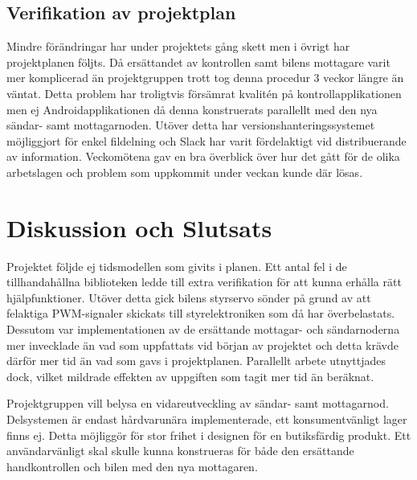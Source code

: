 \documentclass[a4paper]{article}
\begin{document}
\subsection{Verifikation av projektplan}
Mindre förändringar har under projektets gång skett men i övrigt har projektplanen följts. Då ersättandet av kontrollen samt bilens  mottagare varit mer komplicerad än projektgruppen trott tog denna procedur 3 veckor längre än väntat. Detta problem har troligtvis försämrat kvalitén på kontrollapplikationen men ej Androidapplikationen då denna konstruerats parallellt med den nya sändar- samt mottagarnoden. Utöver detta har versionshanteringssystemet möjliggjort för enkel fildelning och Slack har varit fördelaktigt vid distribuerande av information. Veckomötena gav en bra överblick över hur det gått för de olika arbetslagen och problem som uppkommit under veckan kunde där lösas.



\newpage
\section{Diskussion och Slutsats}

Projektet följde ej tidsmodellen som givits i planen. Ett antal fel i de tillhandahållna biblioteken ledde till extra verifikation för att kunna erhålla rätt hjälpfunktioner. Utöver detta gick bilens styrservo sönder på grund av att felaktiga PWM-signaler skickats till styrelektroniken som då har överbelastats. Dessutom var implementationen av de ersättande mottagar- och sändarnoderna mer invecklade än vad som uppfattats vid början av projektet och detta krävde därför mer tid än vad som gavs i projektplanen. Parallellt arbete utnyttjades dock, vilket mildrade effekten av uppgiften som tagit mer tid än beräknat. 

\vspace{5mm} \noindent
Projektgruppen vill belysa en vidareutveckling av sändar- samt mottagarnod. Delsystemen är endast hårdvarunära implementerade, ett konsumentvänligt lager finns ej. Detta möjliggör för stor frihet i designen för en butiksfärdig produkt. Ett användarvänligt skal skulle kunna konstrueras för både den ersättande handkontrollen och bilen med den nya mottagaren. 
\end{document}
